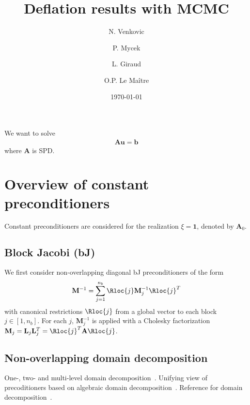 \documentclass{article}
\title{Deflation results with MCMC}
\author{N. Venkovic \and P. Mycek \and L. Giraud \and O.P. Le Ma\^{i}tre}
\date{\today}
\begin{document}
\maketitle

We want to solve
\begin{align}\label{eq:000}
\mathbf{A}\mathbf{u}=\mathbf{b}
\end{align}
where $\mathbf{A}$ is SPD.

\section{Overview of constant preconditioners}
Constant preconditioners are considered for the realization $\xi=\mathbf{1}$, denoted by $\mathbf{A}_0$.
\subsection{Block Jacobi (bJ)}
We first consider non-overlapping diagonal bJ preconditioners of the form
\begin{align}\label{eq:005}
\mathbf{M}^{-1}=\sum_{j=1}^{n_b}\Rloc{j}\mathbf{M}_j^{-1}\Rloc{j}^T
\end{align}
with canonical restrictions $\Rloc{j}$ from a global vector to each block $j\in[1,n_b]$.
For each $j$, $\mathbf{M}_j^{-1}$ is applied with a Cholesky factorization $\mathbf{M}_j=\mathbf{L}_j\mathbf{L}_j^T=\Rloc{j}^T\mathbf{A}\Rloc{j}$.

\subsection{Non-overlapping domain decomposition}
One-, two- and multi-level domain decomposition~\cite{Giraud2006a}.
Unifying view of precoditioners based on algebraic domain decomposition~\cite{Poirel2018}.
Reference for domain decomposition~\cite{Toselli2006}.
\end{document}
